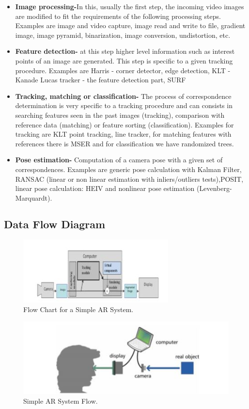 \documentclass{article}
\begin{document}
\begin{itemize}
\item \textbf{Image processing-}In this, usually the ﬁrst step, the incoming video images are modiﬁed to ﬁt the requirements of the following processing steps. Examples are image and video capture, image read and write to ﬁle, gradient image, image pyramid, binarization, image conversion, undistortion, etc. 
\item \textbf{Feature detection-} at this step higher level information such as interest points of an image are generated. This step is speciﬁc to a given tracking procedure. Examples are Harris - corner detector, edge detection, KLT - Kanade Lucas tracker - the feature detection part, SURF 
\item \textbf{Tracking, matching or classiﬁcation-} The process of correspondence determination is very speciﬁc to a tracking procedure and can consists in searching features seen in the past images (tracking), comparison with reference data (matching) or feature sorting (classiﬁcation). Examples for tracking are KLT point tracking, line tracker, for matching features with references there is MSER and for classiﬁcation we have randomized trees.  
\item \textbf{Pose estimation- } Computation of a camera pose with a given set of correspondences. Examples are generic pose calculation with Kalman Filter, RANSAC (linear or non linear estimation with inliers/outliers tests),POSIT, linear pose calculation: HEIV and nonlinear pose estimation (Levenberg-Marquardt). 
\end{itemize}

\subsection{Data Flow Diagram}
\begin{figure}[h]
	\includegraphics[width=\linewidth]{flowchart.jpg}
	\caption{Flow Chart for a Simple AR System. }
\end{figure}
\begin{figure}[h]
	\includegraphics[width=\linewidth]{SimpleAR.jpg}
	\caption{Simple AR System Flow. }
\end{figure}
\end{document}
